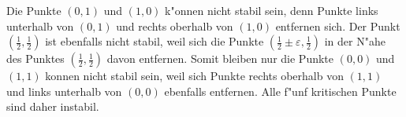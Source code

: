 \begin{loesung}
Die Punkte $(0,1)$ und $(1,0)$ k"onnen nicht stabil sein, denn Punkte
links unterhalb von $(0,1)$ und rechts oberhalb von $(1,0)$ entfernen sich.
Der Punkt $(\frac12,\frac12)$ ist ebenfalls nicht stabil, weil sich die
Punkte $(\frac12\pm\varepsilon,\frac12)$ in der N"ahe des Punktes
$(\frac12,\frac12)$ davon entfernen.
Somit bleiben nur die Punkte $(0,0)$ und $(1,1)$ konnen nicht
stabil sein, weil sich Punkte rechts oberhalb von $(1,1)$ 
und links unterhalb von $(0,0)$ ebenfalls entfernen.
Alle f"unf kritischen Punkte sind daher instabil.
\end{loesung}

